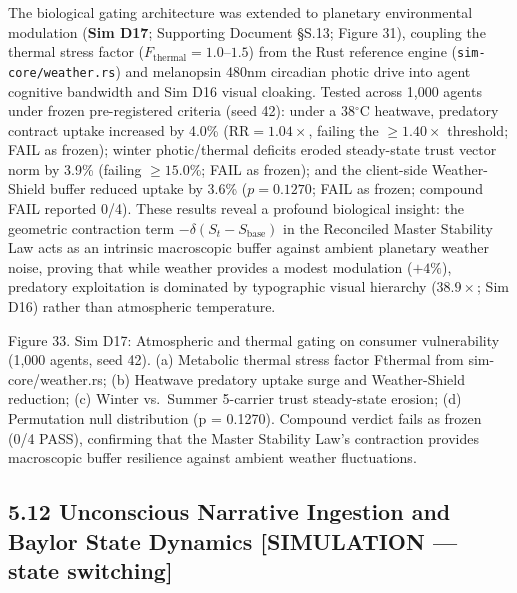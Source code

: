 \documentclass[
]{article}
\begin{document}
The biological gating architecture was extended to planetary
environmental modulation (\textbf{Sim D17}; Supporting Document §S.13;
Figure 31), coupling the thermal stress factor
(\(F_{\text{thermal}} = 1.0\text{--}1.5\)) from the Rust reference
engine (\texttt{sim-core/weather.rs}) and melanopsin 480nm circadian
photic drive into agent cognitive bandwidth and Sim D16 visual cloaking.
Tested across 1,000 agents under frozen pre-registered criteria (seed
42): under a 38\(^\circ\)C heatwave, predatory contract uptake increased
by 4.0\% (\(\text{RR} = 1.04\times\), failing the \(\ge 1.40\times\)
threshold; FAIL as frozen); winter photic/thermal deficits eroded
steady-state trust vector norm by 3.9\% (failing \(\ge 15.0\%\); FAIL as
frozen); and the client-side Weather-Shield buffer reduced uptake by
3.6\% (\(p = 0.1270\); FAIL as frozen; compound FAIL reported 0/4).
These results reveal a profound biological insight: the geometric
contraction term \(-\delta(S_t - S_{\text{base}})\) in the Reconciled
Master Stability Law acts as an intrinsic macroscopic buffer against
ambient planetary weather noise, proving that while weather provides a
modest modulation (\(+4\%\)), predatory exploitation is dominated by
typographic visual hierarchy (\(38.9\times\); Sim D16) rather than
atmospheric temperature.

Figure 33. Sim D17: Atmospheric and thermal gating on consumer
vulnerability (1,000 agents, seed 42). (a) Metabolic thermal stress
factor {Fthermal} from sim-core/weather.rs; (b) Heatwave predatory
uptake surge and Weather-Shield reduction; (c) Winter vs.~Summer
5-carrier trust steady-state erosion; (d) Permutation null distribution
({p = 0.1270}). Compound verdict fails as frozen (0/4 PASS), confirming
that the Master Stability Law's contraction provides macroscopic buffer
resilience against ambient weather fluctuations.

\subsection{5.12 Unconscious Narrative Ingestion and Baylor State
Dynamics {[}SIMULATION --- state
switching{]}}\label{unconscious-narrative-ingestion-and-baylor-state-dynamics-simulation-state-switching}
\end{document}
